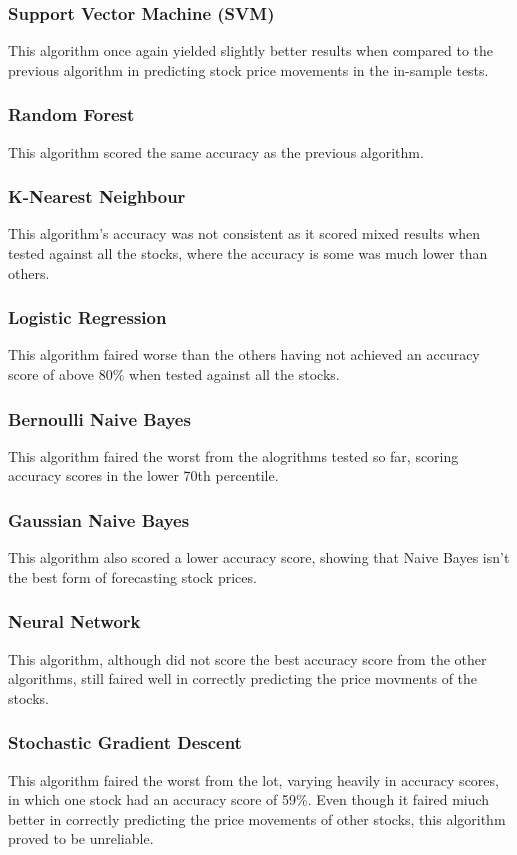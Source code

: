 \subsubsection{Support Vector Machine (SVM)}
This algorithm once again yielded slightly better results when compared to the previous algorithm in predicting stock price movements in the in-sample tests.

\subsubsection{Random Forest}
This algorithm scored the same accuracy as the previous algorithm.

\subsubsection{K-Nearest Neighbour}
This algorithm's accuracy was not consistent as it scored mixed results when tested against all the stocks, where the accuracy is some was much lower than others. 

\subsubsection{Logistic Regression}
This algorithm faired worse than the others having not achieved an accuracy score of above 80\% when tested against all the stocks.

\subsubsection{Bernoulli Naive Bayes}
This algorithm faired the worst from the alogrithms tested so far, scoring accuracy scores in the lower 70th percentile.

\subsubsection{Gaussian Naive Bayes}
This algorithm also scored a lower accuracy score, showing that Naive Bayes isn't the best form of forecasting stock prices.

\subsubsection{Neural Network}
This algorithm, although did not score the best accuracy score from the other algorithms, still faired well in correctly predicting the price movments of the stocks.

\subsubsection{Stochastic Gradient Descent}
This algorithm faired the worst from the lot, varying heavily in accuracy scores, in which one stock had an accuracy score of 59\%. Even though it faired miuch better in correctly predicting the price movements of other stocks, this algorithm proved to be unreliable.

